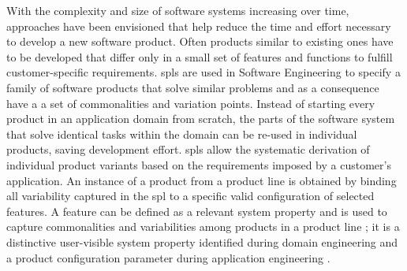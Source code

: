 With the complexity and size of software systems increasing over time, approaches have been envisioned that help reduce the time and effort necessary to develop a new software product. Often products similar to existing ones have to be developed that differ only in a small set of features and functions to fulfill customer-specific requirements.
\Glspl{spl} are used in Software Engineering to specify a family of software products that solve similar problems and as a consequence have a a set of commonalities and variation points. Instead of starting every product in an application domain from scratch, the parts of the software system that solve identical tasks within the domain can be re-used in individual products, saving development effort. 
\Glspl{spl} allow the systematic derivation of individual product variants based on the requirements imposed by a customer's application. 
An instance of a product from a product line is obtained by binding all variability captured in the \gls{spl} to a specific valid configuration of selected features.
A feature can be defined as a relevant system property and is used to capture commonalities and variabilities among products in a product line \cite{Fernandes2008}; it is a distinctive user-visible system property identified during domain engineering and a product configuration parameter during application engineering \cite{Saller2013}.


